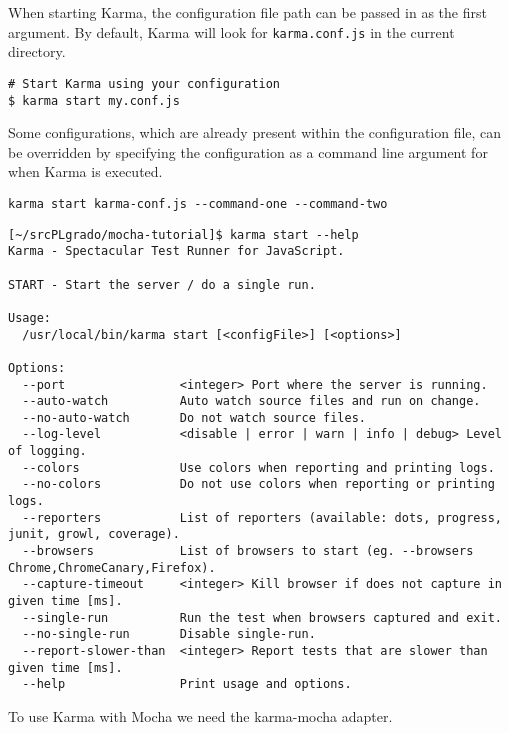 
When starting Karma, the configuration file path can be passed in as the first argument.
By default, Karma will look for \verb|karma.conf.js| in the current directory.
\begin{verbatim}
# Start Karma using your configuration
$ karma start my.conf.js
\end{verbatim}

Some configurations, which are already present within the configuration
file, can be overridden by specifying the configuration as a command
line argument for when Karma is executed.
\begin{verbatim}
karma start karma-conf.js --command-one --command-two
\end{verbatim}

\begin{verbatim}
[~/srcPLgrado/mocha-tutorial]$ karma start --help
Karma - Spectacular Test Runner for JavaScript.

START - Start the server / do a single run.

Usage:
  /usr/local/bin/karma start [<configFile>] [<options>]

Options:
  --port                <integer> Port where the server is running.                            
  --auto-watch          Auto watch source files and run on change.                             
  --no-auto-watch       Do not watch source files.                                             
  --log-level           <disable | error | warn | info | debug> Level of logging.              
  --colors              Use colors when reporting and printing logs.                           
  --no-colors           Do not use colors when reporting or printing logs.                     
  --reporters           List of reporters (available: dots, progress, junit, growl, coverage). 
  --browsers            List of browsers to start (eg. --browsers Chrome,ChromeCanary,Firefox).
  --capture-timeout     <integer> Kill browser if does not capture in given time [ms].         
  --single-run          Run the test when browsers captured and exit.                          
  --no-single-run       Disable single-run.                                                    
  --report-slower-than  <integer> Report tests that are slower than given time [ms].           
  --help                Print usage and options.                                               
\end{verbatim}

To use Karma with Mocha
we need the karma-mocha adapter.

